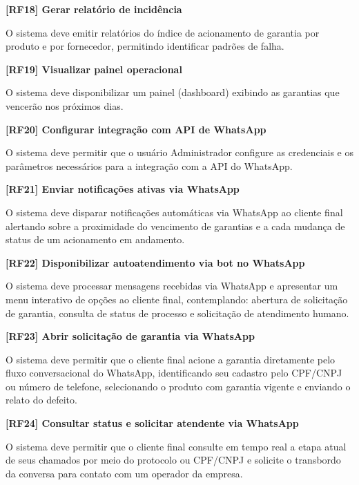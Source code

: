 \vspace{\baselineskip}
\noindent\textbf{[RF18] Gerar relatório de incidência}

O sistema deve emitir relatórios do índice de acionamento de garantia por produto e por fornecedor, permitindo identificar padrões de falha.

\vspace{\baselineskip}
\noindent\textbf{[RF19] Visualizar painel operacional}

O sistema deve disponibilizar um painel (dashboard) exibindo as garantias que vencerão nos próximos dias.

\vspace{\baselineskip}
\noindent\textbf{[RF20] Configurar integração com API de WhatsApp}

O sistema deve permitir que o usuário Administrador configure as credenciais e os parâmetros necessários para a integração com a API do WhatsApp.

\vspace{\baselineskip}
\noindent\textbf{[RF21] Enviar notificações ativas via WhatsApp}

O sistema deve disparar notificações automáticas via WhatsApp ao cliente final alertando sobre a proximidade do vencimento de garantias e a cada mudança de status de um acionamento em andamento.

\vspace{\baselineskip}
\noindent\textbf{[RF22] Disponibilizar autoatendimento via bot no WhatsApp}

O sistema deve processar mensagens recebidas via WhatsApp e apresentar um menu interativo de opções ao cliente final, contemplando: abertura de solicitação de garantia, consulta de status de processo e solicitação de atendimento humano.

\vspace{\baselineskip}
\noindent\textbf{[RF23] Abrir solicitação de garantia via WhatsApp}

O sistema deve permitir que o cliente final acione a garantia diretamente pelo fluxo conversacional do WhatsApp, identificando seu cadastro pelo CPF/CNPJ ou número de telefone, selecionando o produto com garantia vigente e enviando o relato do defeito.

\vspace{\baselineskip}
\noindent\textbf{[RF24] Consultar status e solicitar atendente via WhatsApp}

O sistema deve permitir que o cliente final consulte em tempo real a etapa atual de seus chamados por meio do protocolo ou CPF/CNPJ e solicite o transbordo da conversa para contato com um operador da empresa.

